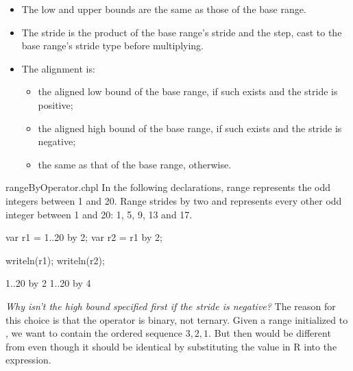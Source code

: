 \begin{itemize}

\item The low and upper bounds are the same as those of the base range.

\item The stride is the product of the base range's stride
      and the step, cast to the base range's stride type before multiplying.

\item The alignment is:

  \begin{itemize}
 
  \item the aligned low bound of the base range, if such exists
        and the stride is positive;

  \item the aligned high bound of the base range, if such exists
        and the stride is negative;

  \item the same as that of the base range, otherwise.

  \end{itemize}

\end{itemize}

\begin{chapelexample}{rangeByOperator.chpl}
In the following declarations, range  represents the odd integers
between 1 and 20. Range  strides  by two and represents
every other odd integer between 1 and 20: 1, 5, 9, 13 and 17.
\begin{chapel}
var r1 = 1..20 by 2;
var r2 = r1 by 2;
\end{chapel}
\begin{chapelpost}
writeln(r1);
writeln(r2);
\end{chapelpost}
\begin{chapeloutput}
1..20 by 2
1..20 by 4
\end{chapeloutput}
\end{chapelexample}

\begin{rationale}
{\it Why isn't the high bound specified first if the stride is
negative?}  The reason for this choice is that the  operator
is binary, not ternary.  Given a range  initialized
to , we want  to contain the ordered sequence
$3,2,1$.  But then  would be different from  even though it should be identical by substituting the value in
R into the expression.
\end{rationale}



